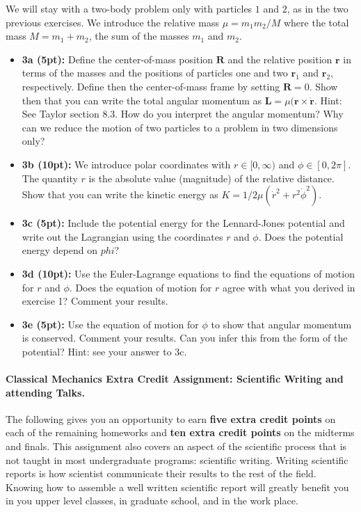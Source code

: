 \documentclass[%
oneside,                 %
final,                   %
10pt]{article}
\begin{document}
We will stay with a two-body problem only with particles $1$ and $2$, as in the two previous exercises.  
We introduce the relative mass $\mu=m_1m_2/M$ where the total mass $M=m_1+m_2$, the sum of the masses $m_1$ and $m_2$.

\begin{itemize}
\item \textbf{3a (5pt):} Define the center-of-mass position $\bm{R}$ and the relative position $\bm{r}$ in terms of the masses and the positions of particles one and two $\bm{r}_1$ and $\bm{r}_2$, respectively. Define then the center-of-mass frame by setting $\bm{R}=0$. Show then that you can write the total angular momentum as $\bm{L}=\mu(\bm{r}\times \dot{\bm{r}}$. Hint: See Taylor section 8.3. How do you interpret the angular momentum?  Why can we reduce the motion of two particles to a problem in two dimensions only?

\item \textbf{3b (10pt):} We introduce polar coordinates with $r\in [0,\infty)$ and $\phi\in[0,2\pi]$. The quantity $r$ is the absolute value (magnitude) of the relative distance. Show that you can write the kinetic energy as $K=1/2\mu(\dot{r}^2+r^2\dot{\phi}^2)$.

\item \textbf{3c (5pt):} Include the potential energy for the Lennard-Jones potential and write out the Lagrangian using the coordinates $r$ and $\phi$. Does the potential energy depend on $phi$?

\item \textbf{3d (10pt):} Use the Euler-Lagrange equations to find the equations of motion for $r$ and $\phi$. Does the equation of motion for $r$ agree with what you derived in exercise 1? Comment your results.

\item \textbf{3e (5pt):} Use the equation of motion for $\phi$ to show that angular momentum is conserved. Comment your results. Can you infer this from the form of the potential? Hint: see your answer to 3c.
\end{itemize}

\noindent
\paragraph{Classical Mechanics Extra Credit Assignment: Scientific Writing and attending Talks.}
The following gives you an opportunity to earn \textbf{five extra credit
points} on each of the remaining homeworks and \textbf{ten extra credit points}
on the midterms and finals.  This assignment also covers an aspect of
the scientific process that is not taught in most undergraduate
programs: scientific writing.  Writing scientific reports is how
scientist communicate their results to the rest of the field.  Knowing
how to assemble a well written scientific report will greatly benefit
you in you upper level classes, in graduate school, and in the work
place.
\end{document}
